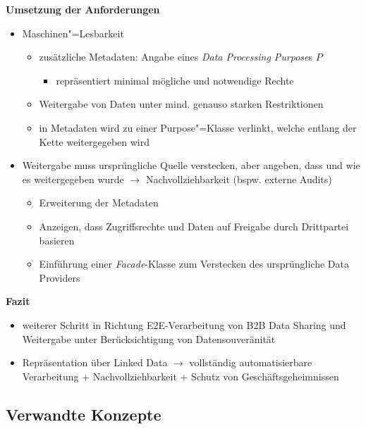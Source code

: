 \textbf{Umsetzung der Anforderungen}~\cite{bothSolidBasedB2BData2025}
\begin{itemize}
    \item Maschinen"=Lesbarkeit
    \begin{itemize}
        \item zusätzliche Metadaten: Angabe eines \emph{Data Processing Purpose}s $P$
        \begin{itemize}
            \item repräsentiert minimal mögliche und notwendige Rechte
        \end{itemize}
        \item Weitergabe von Daten unter mind. genauso starken Restriktionen
        \item in Metadaten wird zu einer Purpose"=Klasse verlinkt, welche entlang der Kette weitergegeben wird
    \end{itemize}
    
    \item Weitergabe muss ursprüngliche Quelle verstecken, aber angeben, dass und wie es weitergegeben wurde $\to$ Nachvollziehbarkeit (bspw. externe Audits)
    \begin{itemize}
        \item Erweiterung der Metadaten
        \item Anzeigen, dass Zugriffsrechte und Daten auf Freigabe durch Drittpartei basieren
        \item Einführung einer \emph{Facade}-Klasse zum Verstecken des ursprüngliche Data Providers
    \end{itemize}
\end{itemize}

\vspace{1cm}

\textbf{Fazit}~\cite{bothSolidBasedB2BData2025}
\begin{itemize}
    \item weiterer Schritt in Richtung E2E-Verarbeitung von B2B Data Sharing und Weitergabe unter Berücksichtigung von Datensouveränität
    \item Repräsentation über Linked Data $\to$ vollständig automatisierbare Verarbeitung + Nachvollziehbarkeit + Schutz von Geschäftsgeheimnissen
\end{itemize}


\subsection{Verwandte Konzepte}

